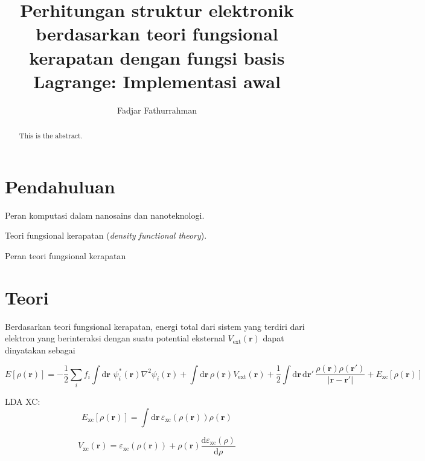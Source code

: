 \documentclass[%
reprint,
amsmath,
amssymb,
aps,
]{revtex4-1}
\begin{document}
\title{Perhitungan struktur elektronik berdasarkan teori fungsional
    kerapatan dengan fungsi basis Lagrange: Implementasi awal}
\author{Fadjar Fathurrahman}

\begin{abstract}
This is the abstract.
\end{abstract}

\maketitle

\section{Pendahuluan}

Peran komputasi dalam nanosains dan nanoteknologi.

Teori fungsional kerapatan (\emph{density functional theory}).

Peran teori fungsional kerapatan

\section{Teori}

Berdasarkan teori fungsional kerapatan,
energi total dari sistem yang terdiri dari elektron yang berinteraksi
dengan suatu potential eksternal $V_{\mathrm{ext}}(\mathbf{r})$
dapat dinyatakan sebagai
\begin{widetext}
\begin{equation}
E[\rho(\mathbf{r})] = 
-\frac{1}{2}\sum_{i}f_{i}
\int\mathrm{d}\mathbf{r}\,
\, \psi^{*}_{i}(\mathbf{r}) \nabla^2 \psi_{i}(\mathbf{r})
+ \int\mathrm{d}\mathbf{r}\,
\rho(\mathbf{r}) V_{\mathrm{ext}}(\mathbf{r})
+
\frac{1}{2}\int\mathrm{d}\mathbf{r}\,\mathrm{d}\mathbf{r}'\,
\frac{\rho(\mathbf{r})\rho(\mathbf{r}')}{\left|\mathbf{r}-\mathbf{r}'\right|}
+ E_{\mathrm{xc}}[\rho(\mathbf{r})]
\end{equation}
\end{widetext}

LDA XC:
\begin{equation}
E_{\mathrm{xc}}[\rho(\mathbf{r})] =
\int\mathrm{d}\mathbf{r}\,
\varepsilon_{\mathrm{xc}}(\rho(\mathbf{r}))
\rho(\mathbf{r})
\end{equation}

\begin{equation}
V_{\mathrm{xc}}(\mathbf{r}) = \varepsilon_{\mathrm{xc}}(\rho(\mathbf{r}))
+ \rho(\mathbf{r})\frac{\mathrm{d}\varepsilon_{\mathrm{xc}}(\rho)}{\mathrm{d}\rho}
\end{equation}
\end{document}
